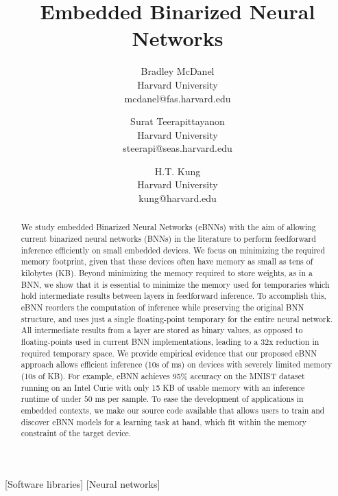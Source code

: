 \documentclass[10pt,emptycopyrightspace]{ewsn-proc}
\author{
 Bradley McDanel\\
 Harvard University\\
  mcdanel@fas.harvard.edu
 \and
 Surat Teerapittayanon\\
 Harvard University\\
 steerapi@seas.harvard.edu
 \and
 H.T. Kung\\
 Harvard University\\
 kung@harvard.edu
}
\title{Embedded Binarized Neural Networks}
\begin{document}
\maketitle

\begin{abstract}
We study embedded Binarized Neural Networks (eBNNs) with the aim of allowing current binarized neural networks (BNNs) in the literature to perform feedforward inference efficiently on small embedded devices. We focus on minimizing the required memory footprint, given that these devices often have memory as small as tens of kilobytes (KB). Beyond minimizing the memory required to store weights, as in a BNN, we show that it is essential to minimize the memory used for temporaries which hold intermediate results between layers in feedforward inference. To accomplish this, eBNN reorders the computation of inference while preserving the original BNN structure, and uses just a single floating-point temporary for the entire neural network. All intermediate results from a layer are stored as binary values, as opposed to floating-points used in current BNN implementations, leading to a 32x reduction in required temporary space. We provide empirical evidence that our proposed eBNN approach allows efficient inference (10s of ms) on devices with severely limited memory (10s of KB). For example, eBNN achieves 95\% accuracy on the MNIST dataset running on an Intel Curie with only 15 KB of usable memory with an inference runtime of under $50$ ms per sample. 
To ease the development of applications in embedded contexts, we make our source code available that allows users to train and discover eBNN models for a learning task at hand, which fit within the memory constraint of the target device.
\end{abstract}

%
%


[Software libraries]
[Neural networks]
\end{document}
